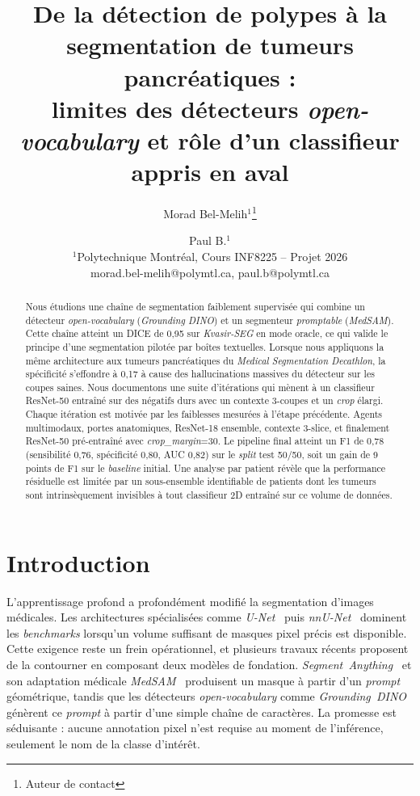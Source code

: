 \documentclass{article}
\title{De la d\'etection de polypes \`a la segmentation de tumeurs pancr\'eatiques :\\
limites des d\'etecteurs \emph{open-vocabulary} et r\^ole d'un classifieur appris en aval}
\author{
Morad Bel-Melih$^{1}$\footnote{Auteur de contact}\and
Paul B.$^{1}$\\
\affiliations
$^{1}$Polytechnique Montr\'eal, Cours INF8225 -- Projet 2026\\
\emails
morad.bel-melih@polymtl.ca,
paul.b@polymtl.ca
}
\begin{document}
\maketitle

\begin{abstract}
Nous \'etudions une cha\^ine de segmentation faiblement supervis\'ee qui combine
un d\'etecteur \emph{open-vocabulary} (\emph{Grounding DINO}) et un segmenteur
\emph{promptable} (\emph{MedSAM}). Cette cha\^ine atteint un DICE de 0{,}95
sur \emph{Kvasir-SEG} en mode oracle, ce qui valide le principe d'une
segmentation pilot\'ee par bo\^ites textuelles. Lorsque nous appliquons la
m\^eme architecture aux tumeurs pancr\'eatiques du \emph{Medical Segmentation
Decathlon}, la sp\'ecificit\'e s'effondre \`a 0{,}17 \`a cause des hallucinations
massives du d\'etecteur sur les coupes saines. Nous documentons une suite
d'it\'erations qui m\`enent \`a un classifieur ResNet-50 entra\^in\'e
sur des n\'egatifs durs avec un contexte 3-coupes et un \emph{crop} \'elargi.
Chaque it\'eration est motiv\'ee par les faiblesses mesur\'ees \`a l'\'etape
pr\'ec\'edente. Agents multimodaux, portes anatomiques, ResNet-18 ensemble,
contexte 3-slice, et finalement ResNet-50 pr\'e-entra\^in\'e avec
\emph{crop\_margin}=30. Le pipeline final atteint un F1 de 0{,}78 (sensibilit\'e
0{,}76, sp\'ecificit\'e 0{,}80, AUC 0{,}82) sur le \emph{split} test
50/50, soit un gain de 9 points de F1 sur le \emph{baseline} initial. Une
analyse par patient r\'ev\`ele que la performance r\'esiduelle est
limit\'ee par un sous-ensemble identifiable de patients dont les tumeurs
sont intrins\`equement invisibles \`a tout classifieur 2D entra\^in\'e sur ce
volume de donn\'ees.
\end{abstract}

\section{Introduction}

L'apprentissage profond a profond\'ement modifi\'e la segmentation d'images
m\'edicales. Les architectures sp\'ecialis\'ees comme \emph{U-Net}~\cite{ronneberger2015unet}
puis \emph{nnU-Net}~\cite{isensee2021nnunet} dominent les
\emph{benchmarks} lorsqu'un volume suffisant de masques pixel pr\'ecis est
disponible. Cette exigence reste un frein op\'erationnel, et plusieurs travaux
r\'ecents proposent de la contourner en composant deux mod\`eles de fondation.
\emph{Segment~Anything}~\cite{kirillov2023sam} et son adaptation m\'edicale
\emph{MedSAM}~\cite{ma2024medsam} produisent un masque \`a partir d'un
\emph{prompt} g\'eom\'etrique, tandis que les d\'etecteurs
\emph{open-vocabulary} comme \emph{Grounding~DINO}~\cite{liu2024groundingdino}
g\'en\`erent ce \emph{prompt} \`a partir d'une simple cha\^ine de caract\`eres.
La promesse est s\'eduisante : aucune annotation pixel n'est requise au moment
de l'inf\'erence, seulement le nom de la classe d'int\'er\^et.
\end{document}
